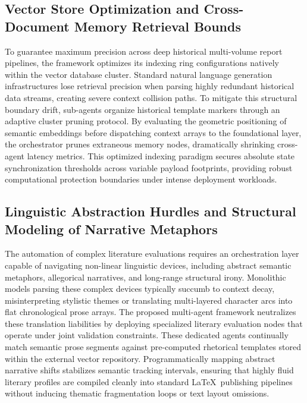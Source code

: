 \subsection{Vector Store Optimization and Cross-Document Memory Retrieval Bounds}
To guarantee maximum precision across deep historical multi-volume report pipelines, the framework optimizes its indexing ring configurations natively within the vector database cluster. Standard natural language generation infrastructures lose retrieval precision when parsing highly redundant historical data streams, creating severe context collision paths. To mitigate this structural boundary drift, sub-agents organize historical template markers through an adaptive cluster pruning protocol. By evaluating the geometric positioning of semantic embeddings before dispatching context arrays to the foundational layer, the orchestrator prunes extraneous memory nodes, dramatically shrinking cross-agent latency metrics. This optimized indexing paradigm secures absolute state synchronization thresholds across variable payload footprints, providing robust computational protection boundaries under intense deployment workloads.

\subsection{Linguistic Abstraction Hurdles and Structural Modeling of Narrative Metaphors}
The automation of complex literature evaluations requires an orchestration layer capable of navigating non-linear linguistic devices, including abstract semantic metaphors, allegorical narratives, and long-range structural irony. Monolithic models parsing these complex devices typically succumb to context decay, misinterpreting stylistic themes or translating multi-layered character arcs into flat chronological prose arrays. The proposed multi-agent framework neutralizes these translation liabilities by deploying specialized literary evaluation nodes that operate under joint validation constraints. These dedicated agents continually match semantic prose segments against pre-computed rhetorical templates stored within the external vector repository. Programmatically mapping abstract narrative shifts stabilizes semantic tracking intervals, ensuring that highly fluid literary profiles are compiled cleanly into standard \LaTeX\ publishing pipelines without inducing thematic fragmentation loops or text layout omissions.

